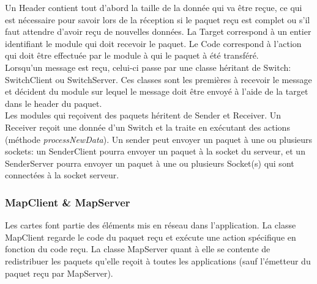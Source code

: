 Un Header contient tout d'abord la taille de la donnée qui va être reçue, ce qui est nécessaire pour savoir lors de la réception si le paquet reçu est complet ou s'il faut attendre d'avoir reçu de nouvelles données. La Target correspond à un entier identifiant le module qui doit recevoir le paquet. Le Code correspond à l'action qui doit être effectuée par le module à qui le paquet à été transféré.\\

Lorsqu'un message est reçu, celui-ci passe par une classe héritant de Switch: SwitchClient ou SwitchServer. Ces classes sont les premières à recevoir le message et décident du module sur lequel le message doit être envoyé à l'aide de la target dans le header du paquet.\\

Les modules qui reçoivent des paquets héritent de Sender et Receiver. Un Receiver reçoit une donnée d'un Switch et la traite en exécutant des actions (méthode \emph{processNewData}). Un sender peut envoyer un paquet à une ou plusieurs sockets: un SenderClient pourra envoyer un paquet à la socket du serveur, et un SenderServer pourra envoyer un paquet à une ou plusieurs Socket(s) qui sont connectées à la socket serveur.\\

\subsubsection{MapClient \& MapServer}
Les cartes font partie des éléments mis en réseau dans l'application. La classe MapClient regarde le code du paquet reçu et exécute une action spécifique en fonction du code reçu. La classe MapServer quant à elle se contente de redistribuer les paquets qu'elle reçoit à toutes les applications (sauf l'émetteur du paquet reçu par MapServer).\\

